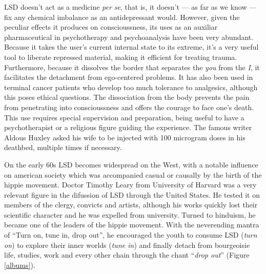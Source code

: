 LSD doesn't act as a medicine \textit{per se}, that is, it doesn't --- as far as we know --- fix any chemical imbalance as an antidepressant would. However, given the peculiar effects it produces on conscioussness, its uses as an auxiliar pharmaceutical in psychotherapy and psychoanalysis have been very abundant. Because it takes the user's current internal state to its extreme, it's a very useful tool to liberate repressed material, making it efficient for treating trauma. Furthermore, because it dissolves the border that separates the \textit{you} from the \textit{I}, it facilitates the detachment from ego-centered problems. It has also been used in terminal cancer patients who develop too much tolerance to analgesics, although this poses ethical questions. The dissociation from the body prevents the pain from penetrating into conscioussness and offers the courage to face one's death. This use requires special supervision and preparation, being useful to have a psychotherapist or a religious figure guiding the experience. The famous writer Aldous Huxley asked his wife to be injected with 100 microgram doses in his deathbed, multiple times if necessary.

On the early 60s LSD becomes widespread on the West, with a notable influence on american society which was accompanied casual or causally by the birth of the hippie movement. Doctor Timothy Leary from University of Harvard was a very relevant figure in the difussion of LSD through the United States. He tested it on members of the clergy, convicts and artists, although his works quickly lost their scientific character and he was expelled from university. Turned to hinduism, he became one of the leaders of the hippie movement. With the neverending mantra of \enquote{Turn on, tune in, drop out}, he encouraged the youth to consume LSD (\textit{turn on}) to explore their inner worlds (\textit{tune in}) and finally detach from bourgeoisie life, studies, work and every other chain through the chant \enquote{\textit{drop out}} (Figure \ref{albums}).

